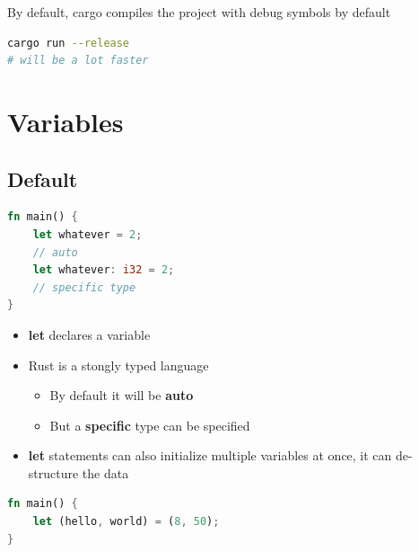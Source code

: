\documentclass{report}
\begin{document}
\begin{multicols*}{2}
By default, cargo compiles the project with debug symbols by default
\begin{tcolorbox}[title=Disable Debug Symbols,colback=backcolour,size=small,left=4mm]
\begin{lstlisting}[language=bash]
cargo run --release
# will be a lot faster
\end{lstlisting}
\end{tcolorbox}


\section{Variables}

\subsection{Default}

\begin{tcolorbox}[title=Structure,colback=backcolour,size=small,left=4mm]
\begin{lstlisting}[language=rust]
fn main() {
	let whatever = 2;
	// auto
	let whatever: i32 = 2;
	// specific type
}
\end{lstlisting}
\end{tcolorbox}

\begin{itemize}
	\item \textbf{let} declares a variable 
	\item Rust is a stongly typed language
		\begin{itemize}
			\item By default it will be \textbf{auto} 
			\item But a \textbf{specific} type can be specified
		\end{itemize}
\end{itemize}

\begin{itemize}
	\item \textbf{let} statements can also initialize multiple variables at once, it can de-structure the data
\end{itemize}

\begin{tcolorbox}[title=Deconstruction Example,colback=backcolour,size=small,left=4mm]
\begin{lstlisting}[language=rust]
fn main() {
	let (hello, world) = (8, 50);
}
\end{lstlisting}
\end{tcolorbox}


\end{multicols*}
\end{document}
